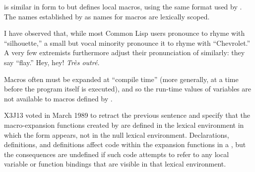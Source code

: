 \begin{defspec}
 is similar in form to  but defines local macros,
using the same format used by .
The names established by  as names for macros are
lexically scoped.

\begin{new}
I have observed that, while most Common Lisp users pronounce 
to rhyme with ``silhouette,'' a small but vocal minority pronounce it
to rhyme with ``Chevrolet.''  A very few extremists furthermore
adjust their pronunciation
of  similarly: they say ``flay.''
Hey, hey!  \emph{Tr\`es outr\'e.}
\end{new}

Macros often must be expanded at ``compile time'' (more generally,
at a time before the program itself is executed), and so
the run-time values of variables are not available to macros
defined by .

\begin{newer}
X3J13 voted in March 1989 
to retract the previous sentence and specify that the macro-expansion
functions created by  are defined in the lexical environment in which
the  form appears, not in the null lexical environment.
Declarations,  definitions, and  definitions
affect code within the expansion functions in a , but the
consequences are undefined if such code attempts to refer to
any local variable or function bindings that are visible in that
lexical environment.
\end{newer}


\end{defspec}
